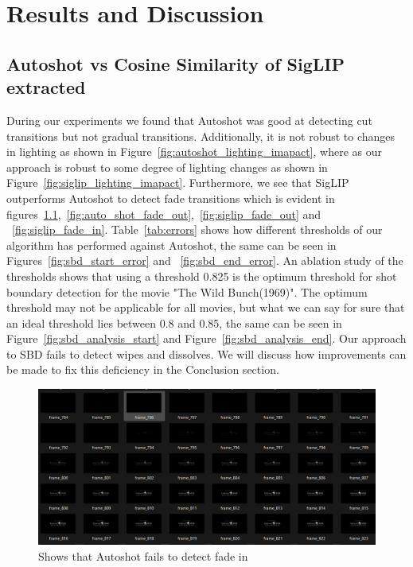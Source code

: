 \documentclass[12pt]{report}
\begin{document}
	\newpage
	\chapter{Results and Discussion}
	
\section{Autoshot vs Cosine Similarity of SigLIP extracted}

During our experiments we found that Autoshot was good at detecting cut transitions but not gradual transitions. Additionally, it is not robust to changes in lighting as shown in Figure~\ref{fig:autoshot_lighting_imapact}, where as our approach is robust to some degree of lighting changes as shown in Figure~\ref{fig:siglip_lighting_imapact}. Furthermore, we see that SigLIP outperforms Autoshot to detect fade transitions which is evident in figures~\ref{fig:auto_shot_fade_in},~\ref{fig:auto_shot_fade_out},~\ref{fig:siglip_fade_out} and ~\ref{fig:siglip_fade_in}. Table~\ref{tab:errors} shows how different thresholds of our algorithm has performed against Autoshot, the same can be seen in Figures~\ref{fig:sbd_start_error} and ~\ref{fig:sbd_end_error}. An ablation study of the thresholds shows that using a threshold 0.825 is the optimum threshold for shot boundary detection for the movie "The Wild Bunch(1969)". The optimum threshold may not be applicable for all movies, but what we can say for sure that an ideal threshold lies between 0.8 and 0.85, the same can be seen in Figure~\ref{fig:sbd_analysis_start} and Figure~\ref{fig:sbd_analysis_end}. Our approach to SBD fails to detect wipes and dissolves. We will discuss how improvements can be made to fix this deficiency in the Conclusion section.


\begin{figure}[h]  %
	\centering
	\includegraphics[width=\linewidth]{autoshot_fade_in.png}  %
	\caption{Shows that Autoshot fails to detect fade in}
	\label{fig:auto_shot_fade_in}
\end{figure}
\end{document}
